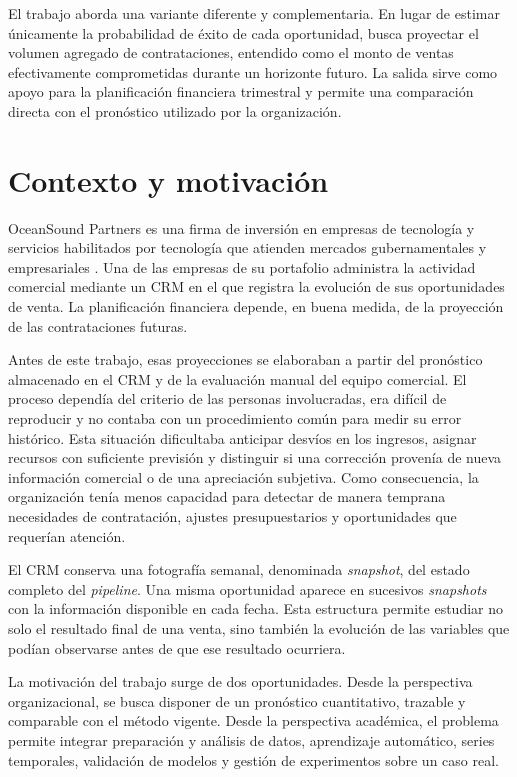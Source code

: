 El trabajo aborda una variante diferente y complementaria. En lugar de estimar únicamente la probabilidad de éxito de cada oportunidad, busca proyectar el volumen agregado de contrataciones, entendido como el monto de ventas efectivamente comprometidas durante un horizonte futuro. La salida sirve como apoyo para la planificación financiera trimestral y permite una comparación directa con el pronóstico utilizado por la organización.

\section{Contexto y motivación}
\label{sec:contextoMotivacion}

OceanSound Partners es una firma de inversión en empresas de tecnología y servicios habilitados por tecnología que atienden mercados gubernamentales y empresariales \citep{OceanSoundWebsite}. Una de las empresas de su portafolio administra la actividad comercial mediante un CRM en el que registra la evolución de sus oportunidades de venta. La planificación financiera depende, en buena medida, de la proyección de las contrataciones futuras.

Antes de este trabajo, esas proyecciones se elaboraban a partir del pronóstico almacenado en el CRM y de la evaluación manual del equipo comercial. El proceso dependía del criterio de las personas involucradas, era difícil de reproducir y no contaba con un procedimiento común para medir su error histórico. Esta situación dificultaba anticipar desvíos en los ingresos, asignar recursos con suficiente previsión y distinguir si una corrección provenía de nueva información comercial o de una apreciación subjetiva. Como consecuencia, la organización tenía menos capacidad para detectar de manera temprana necesidades de contratación, ajustes presupuestarios y oportunidades que requerían atención.

El CRM conserva una fotografía semanal, denominada \textit{snapshot}, del estado completo del \textit{pipeline}. Una misma oportunidad aparece en sucesivos \textit{snapshots} con la información disponible en cada fecha. Esta estructura permite estudiar no solo el resultado final de una venta, sino también la evolución de las variables que podían observarse antes de que ese resultado ocurriera.

La motivación del trabajo surge de dos oportunidades. Desde la perspectiva organizacional, se busca disponer de un pronóstico cuantitativo, trazable y comparable con el método vigente. Desde la perspectiva académica, el problema permite integrar preparación y análisis de datos, aprendizaje automático, series temporales, validación de modelos y gestión de experimentos sobre un caso real.

